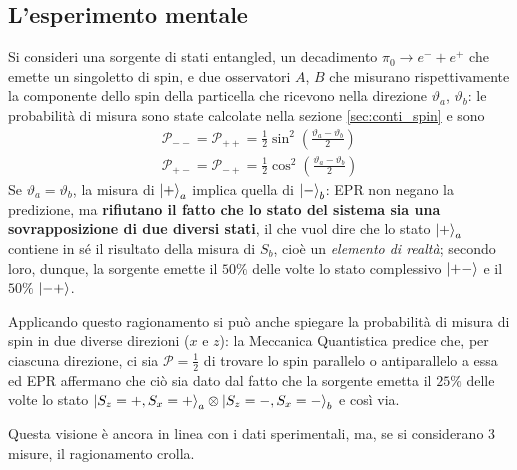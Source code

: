 \subsection{L'esperimento mentale}
Si consideri una sorgente di stati entangled, un decadimento $\pi_0\to e^- + e^+$ che
emette un singoletto di spin, e due osservatori $A$, $B$ che misurano rispettivamente la componente
dello spin della particella che ricevono nella direzione $\vartheta_a$, $\vartheta_b$: le probabilità
di misura sono state calcolate nella sezione \ref{sec:conti_spin} e sono
\begin{gather*}
\mathcal{P}_{--}=\mathcal{P}_{++}=\frac{1}{2}\sin^2\left(\frac{\vartheta_a-\vartheta_b}{2}\right)\\
\mathcal{P}_{+-}=\mathcal{P}_{-+}=\frac{1}{2}\cos^2\left(\frac{\vartheta_a-\vartheta_b}{2}\right)
\end{gather*}
Se $\vartheta_a=\vartheta_b$, la misura di $\ket{+}_a$ implica quella di $\ket{-}_b$: EPR non
negano la predizione, ma \textbf{rifiutano il fatto che lo stato del sistema sia una sovrapposizione
di due diversi stati}, il che vuol dire che lo stato $\ket{+}_a$ contiene in sé il risultato
della misura di $S_b$, cioè un \textit{elemento di realtà}; secondo loro, dunque, la sorgente
emette il $50\%$ delle volte lo stato complessivo $\ket{+-}$ e il $50\%$ $\ket{-+}$.

Applicando questo ragionamento si può anche spiegare la probabilità di misura di spin in due diverse
direzioni ($x$ e $z$): la Meccanica Quantistica predice che, per ciascuna direzione, ci sia
$\mathcal{P}=\frac{1}{2}$ di trovare lo spin parallelo o antiparallelo a essa ed EPR affermano che
ciò sia dato dal fatto che la sorgente emetta il $25\%$ delle volte lo stato
$\ket{S_z=+,S_x=+}_a\otimes\ket{S_z=-,S_x=-}_b$ e così via.

Questa visione è ancora in linea con i dati sperimentali, ma, se si considerano 3 misure, il
ragionamento crolla.
